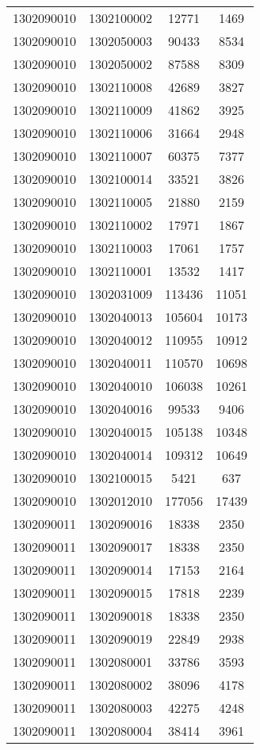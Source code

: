 \begin{longtable}[h]{llcc}
		1302090010 & 1302100002 & 12771 & 1469\\
		1302090010 & 1302050003 & 90433 & 8534\\
		1302090010 & 1302050002 & 87588 & 8309\\
		1302090010 & 1302110008 & 42689 & 3827\\
		1302090010 & 1302110009 & 41862 & 3925\\
		1302090010 & 1302110006 & 31664 & 2948\\
		1302090010 & 1302110007 & 60375 & 7377\\
		1302090010 & 1302100014 & 33521 & 3826\\
		1302090010 & 1302110005 & 21880 & 2159\\
		1302090010 & 1302110002 & 17971 & 1867\\
		1302090010 & 1302110003 & 17061 & 1757\\
		1302090010 & 1302110001 & 13532 & 1417\\
		1302090010 & 1302031009 & 113436 & 11051\\
		1302090010 & 1302040013 & 105604 & 10173\\
		1302090010 & 1302040012 & 110955 & 10912\\
		1302090010 & 1302040011 & 110570 & 10698\\
		1302090010 & 1302040010 & 106038 & 10261\\
		1302090010 & 1302040016 & 99533 & 9406\\
		1302090010 & 1302040015 & 105138 & 10348\\
		1302090010 & 1302040014 & 109312 & 10649\\
		1302090010 & 1302100015 & 5421 & 637\\
		1302090010 & 1302012010 & 177056 & 17439\\
		1302090011 & 1302090016 & 18338 & 2350\\
		1302090011 & 1302090017 & 18338 & 2350\\
		1302090011 & 1302090014 & 17153 & 2164\\
		1302090011 & 1302090015 & 17818 & 2239\\
		1302090011 & 1302090018 & 18338 & 2350\\
		1302090011 & 1302090019 & 22849 & 2938\\
		1302090011 & 1302080001 & 33786 & 3593\\
		1302090011 & 1302080002 & 38096 & 4178\\
		1302090011 & 1302080003 & 42275 & 4248\\
		1302090011 & 1302080004 & 38414 & 3961\\

\end{longtable}
